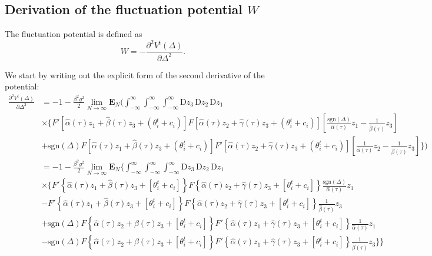 \documentclass[reprint,amsmath,amssymb,aps]{revtex4-2}
\begin{document}
\subsection{Derivation of the fluctuation potential $W$}
\label{app;derivationPotentialFluctuation}

The fluctuation potential is defined as
\[
W = -\frac{\partial^2 V^t(\Delta)}{\partial \Delta^2}.
\]

We start by writing out the explicit form of the second derivative of the potential:
\begin{align*}
    \frac{\partial^2 V^t(\Delta)}{\partial \Delta^2}
    &=
    -1 - \frac{\beta^2g^2}{2}
    \lim_{N\to\infty} \mathbf{E}_{N} \Bigg( \int_{-\infty}^\infty \int_{-\infty}^\infty \int_{-\infty}^\infty \mathrm{D}z_3 \, \mathrm{D}z_2 \, \mathrm{D}z_1 \, 
    \\
    &\times
    \Bigg\{
    F'\left[\hat{\alpha}(\tau) z_1 + \hat{\beta}(\tau) z_3 + \left(\theta_i^t + c_i\right)\right]
    F\left[\hat{\alpha}(\tau) z_2 + \hat{\gamma}(\tau) z_3 + \left(\theta_i^{t} + c_i\right)\right]
    \left[\frac{\mathrm{sgn}(\Delta)}{\hat{\alpha}(\tau)} z_1 - \frac{1}{\hat{\beta}(\tau)} z_3\right]
    \\
    &
    + \mathrm{sgn}(\Delta)
    F\left[\hat{\alpha}(\tau) z_1 + \hat{\beta}(\tau) z_3 + \left(\theta_i^t + c_i\right)\right]
    F'\left[\hat{\alpha}(\tau) z_2 + \hat{\gamma}(\tau) z_3 + \left(\theta_i^{t} + c_i\right)\right]
    \left[\frac{1}{\hat{\alpha}(\tau)} z_2 - \frac{1}{\hat{\beta}(\tau)} z_3\right]
    \Bigg\}
    \Bigg)\\
        &=
    -1 - \frac{\beta^2g^2}{2}
    \lim_{N\to\infty} \mathbf{E}_{N} \Bigg\{\int_{-\infty}^\infty \int_{-\infty}^\infty \int_{-\infty}^\infty \mathrm{D}z_3 \, \mathrm{D}z_2 \, \mathrm{D}z_1 \, 
    \\
    &\times
    \Big\{
    F'\left\{\hat{\alpha}(\tau) z_1 + \hat{\beta}(\tau) z_3 + \left[\theta_i^t + c_i\right]\right\}
    F\left\{\hat{\alpha}(\tau) z_2 + \hat{\gamma}(\tau) z_3 + \left[\theta_i^{t} + c_i\right]\right\}
    \frac{\mathrm{sgn}(\Delta)}{\hat{\alpha}(\tau)} z_1
    \\
    &
    -
    F'\left\{\hat{\alpha}(\tau) z_1 + \hat{\beta}(\tau) z_3 + \left[\theta_i^t + c_i\right]\right\}
    F\left\{\hat{\alpha}(\tau) z_2 + \hat{\gamma}(\tau) z_3 + \left[\theta_i^{t} + c_i\right]\right\}
    \frac{1}{\hat{\beta}(\tau)} z_3
    \\
    &
    + \mathrm{sgn}(\Delta)
    F\left\{\hat{\alpha}(\tau) z_2 + \hat{\beta}(\tau) z_3 + \left[\theta_i^t + c_i\right]\right\}
    F'\left\{\hat{\alpha}(\tau) z_1 + \hat{\gamma}(\tau) z_3 + \left[\theta_i^{t} + c_i\right]\right\}
    \frac{1}{\hat{\alpha}(\tau)} z_1 
    \\
    &
    -
    \mathrm{sgn}(\Delta)
    F\left\{\hat{\alpha}(\tau) z_2 + \hat{\beta}(\tau) z_3 + \left[\theta_i^t + c_i\right]\right\}
    F'\left\{\hat{\alpha}(\tau) z_1 + \hat{\gamma}(\tau) z_3 + \left[\theta_i^{t} + c_i\right]\right\}
    \frac{1}{\hat{\beta}(\tau)} z_3
    \Big\}
    \Bigg\}
\end{align*}
\end{document}
